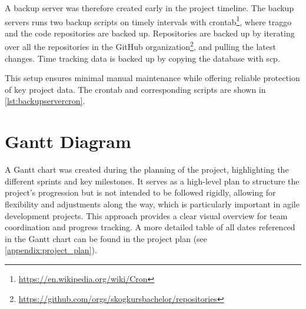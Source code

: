 A backup server was therefore created early in the project timeline. The backup servers runs two backup scripts on timely intervals with crontab\footnote{\url{https://en.wikipedia.org/wiki/Cron}}, where traggo and the code repositories are backed up. Repositories are backed up by iterating over all the repositories in the GitHub organization\footnote{\url{https://github.com/orgs/skogkursbachelor/repositories}}, and pulling the latest changes. Time tracking data is backed up by copying the database with \acrfull{scp}. %

This setup ensures minimal manual maintenance while offering reliable protection of key project data. The crontab and corresponding scripts are shown in \autoref{lst:backupservercron}. 

\begin{figure}[h]

\end{figure}

\section{Gantt Diagram}

A Gantt chart was created during the planning of the project, highlighting the different sprints and key milestones. It serves as a high-level plan to structure the project's progression but is not intended to be followed rigidly, allowing for flexibility and adjustments along the way, which is particularly important in agile development projects. This approach provides a clear visual overview for team coordination and progress tracking. A more detailed table of all dates referenced in the Gantt chart can be found in the project plan (see \autoref{appendix:project_plan}).

